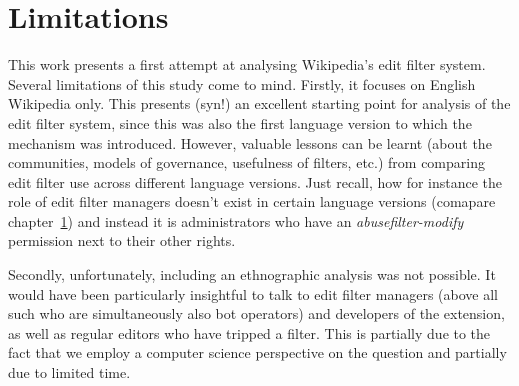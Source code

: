 \begin{comment}
Claudia: * A focus on the Good faith policies/guidelines is a historical development. After the huge surge in edits Wikipedia experienced starting 2005 the community needed a means to handle these (and the proportional amount of vandalism). They opted for automatisation. Automated system branded a lot of good faith edits as vandalism, which drove new comers away. A policy focus on good faith is part of the intentions to fix this.

 could be that the high hit count was made by false positives, which will have led to disabling the filter (TODO: that's a very interesting question actually; how do we know the high number of hits were actually leggit problems the filter wanted to catch and no false positives?)
--  we can't really? unless we study the edits themselves; I did this exemplarily for edits from the peak period in 2016; they were not false positives but a big spam wave.
\end{comment}


\section{Limitations}

This work presents a first attempt at analysing Wikipedia's edit filter system.
Several limitations of this study come to mind.
Firstly, it focuses on English Wikipedia only.
This presents (syn!) an excellent starting point for analysis of the edit filter system, since this was also the first language version to which the mechanism was introduced.
However, valuable lessons can be learnt (about the communities, models of governance, usefulness of filters, etc.) from comparing edit filter use across different language versions.
Just recall, how for instance the role of edit filter managers doesn't exist in certain language versions (comapare chapter~\ref{}) and instead it is administrators who have an \emph{abusefilter-modify} permission next to their other rights.

Secondly, unfortunately, including an ethnographic analysis was not possible.
It would have been particularly insightful to talk to edit filter managers (above all such who are simultaneously also bot operators) and developers of the extension, as well as regular editors who have tripped a filter.
This is partially due to the fact that we employ a computer science perspective on the question and partially due to limited time.

